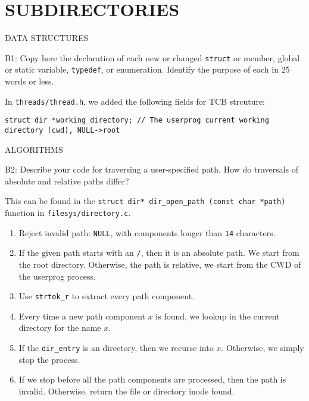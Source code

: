 \section*{SUBDIRECTORIES}

\begin{aspect}{DATA STRUCTURES}
	\begin{qc}
		B1: Copy here the declaration of each new or changed \lstinline{struct} or member,
		global or static variable, \lstinline{typedef}, or enumeration.
		Identify the purpose of each in 25 words or less.
	\end{qc}
	In \lstinline{threads/thread.h}, we added the following fields for TCB strcuture:
	\begin{lstlisting}
struct dir *working_directory; // The userprog current working directory (cwd), NULL->root
	\end{lstlisting}
\end{aspect}

\begin{aspect}{ALGORITHMS}
	\begin{qc}
		B2: Describe your code for traversing a user-specified path.
		How do traversals of absolute and relative paths differ?
	\end{qc}
	This can be found in the \lstinline{struct dir* dir_open_path (const char *path)} function in \lstinline{filesys/directory.c}.
	\begin{enumerate}
		\item Reject invalid path: \lstinline{NULL}, with components longer than \lstinline{14} characters.
		\item If the given path starts with an \lstinline{/}, then it is an absolute path.
		      We start from the root directory.
		      Otherwise, the path is relative, we start from the CWD of the userprog process.
		\item Use \lstinline{strtok_r} to extract every path component.
		\item Every time a new path component $x$ is found, we lookup in the current directory for the name $x$.
		\item If the \lstinline{dir_entry} is an directory, then we recurse into $x$. Otherwise, we simply stop the process.
		\item If we stop before all the path components are processed, then the path is invalid.
		      Otherwise, return the file or directory inode found.
	\end{enumerate}
\end{aspect}

